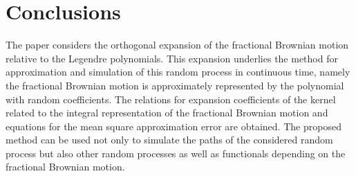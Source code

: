 \documentclass[10pt,reqno]{amsart}
\theoremstyle{plain}
\theoremstyle{remark}
\begin{document}
\section{Conclusions}\label{secSpConcl}

The paper considers the orthogonal expansion of the fractional Brownian motion relative to the Legendre polynomials. This expansion underlies the method for approximation and simulation of this random process in continuous time, namely the fractional Brownian motion is approximately represented by the polynomial with random coefficients. The relations for expansion coefficients of the kernel related to the integral representation of the fractional Brownian motion and equations for the mean square approximation error are obtained. The proposed method can be used not only to simulate the paths of the considered random process but also other random processes as well as functionals depending on the fractional Brownian motion.
\end{document}
